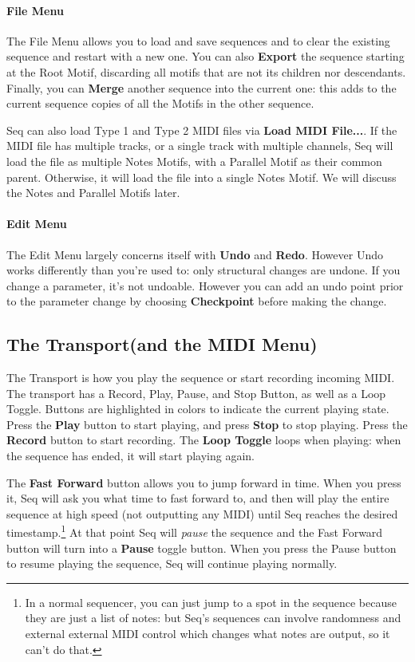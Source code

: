 \documentclass[twoside,10pt]{article}
\begin{document}
\paragraph{File Menu}
The File Menu allows you to load and save sequences and to clear the existing sequence and restart with a new one.  You can also {\bf Export} the sequence starting at the Root Motif, discarding all motifs that are not its children nor descendants.  Finally, you can {\bf Merge} another sequence into the current one: this adds to the current sequence copies of all the Motifs in the other sequence.

Seq can also load Type 1 and Type 2 MIDI files via {\bf Load MIDI File...}.  If the MIDI file has multiple tracks, or a single track with multiple channels, Seq will load the file as multiple Notes Motifs, with a Parallel Motif as their common parent. Otherwise, it will load the file into a single Notes Motif.  We will discuss the Notes and Parallel Motifs later.

\paragraph{Edit Menu}
The Edit Menu largely concerns itself with {\bf Undo} and {\bf Redo}.  However Undo works differently than you're used to: only structural changes are undone.  If you change a parameter, it's not undoable.  However you can add an undo point prior to the parameter change by choosing {\bf Checkpoint} before making the change.


\subsection{The Transport\quad (and the MIDI Menu)}

The Transport is how you play the sequence or start recording incoming MIDI.  The transport has a Record, Play, Pause, and Stop Button, as well as a Loop Toggle.  Buttons are highlighted in colors to indicate the current playing state.  Press the {\bf Play} button to start playing, and press {\bf Stop} to stop playing.  Press the {\bf Record} button to start recording.  The {\bf Loop Toggle} loops when playing: when the sequence has ended, it will start playing again.

The {\bf Fast Forward} button allows you to jump forward in time.  When you press it, Seq will ask you what time to fast forward to, and then will play the entire sequence at high speed (not outputting any MIDI) until Seq reaches the desired timestamp.\footnote{In a normal sequencer, you can just jump to a spot in the sequence because they are just a list of notes: but Seq's sequences can involve randomness and external external MIDI control which changes what notes are output, so it can't do that.}  At that point Seq will {\it pause} the sequence and the Fast Forward button will turn into a {\bf Pause} toggle button.  When you press the Pause button to resume playing the sequence, Seq will continue playing normally. 
\end{document}
